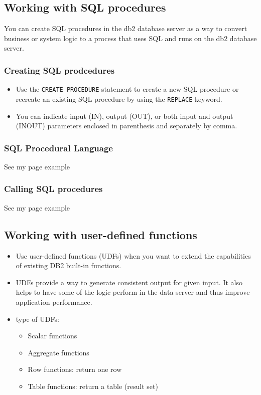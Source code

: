 \documentclass{article}
\begin{document}
\subsection{Working with SQL procedures}
You can create SQL procedures in the db2 database server as a way to convert business or system
logic to a process that uses SQL and runs on the db2 database server.
\subsubsection{Creating SQL prodcedures}
\begin{itemize}
\item Use the \texttt{CREATE PROCEDURE} statement to create a new SQL procedure or recreate an existing
SQL procedure by using the \texttt{REPLACE} keyword.
\item You can indicate input (IN), output (OUT), or both input and output (INOUT) parameters enclosed
in parenthesis and separately by comma.
\end{itemize}
\subsubsection{SQL Procedural Language}
See my page example
\subsubsection{Calling SQL procedures}
See my page example

\subsection{Working with user-defined functions}
\begin{itemize}
\item Use user-defined functions (UDFs) when you want to extend the capabilities of existing DB2 built-in
functions.
\item UDFs provide a way to generate consistent output for given input. It also helps to have some of the
logic perform in the data server and thus improve application performance.
\item type of UDFs:
	\begin{itemize}
	\item Scalar functions
	\item Aggregate functions
	\item Row functions: return one row
	\item Table functions: return a table (result set)
	\end{itemize}
\end{itemize}
\end{document}

